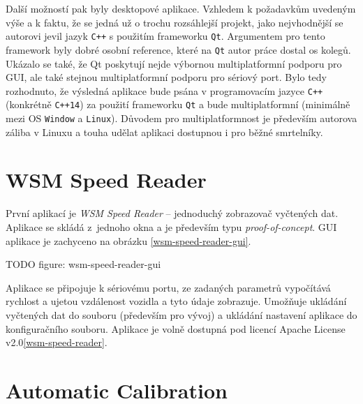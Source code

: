 Další možností pak byly desktopové aplikace. Vzhledem k požadavkům uvedeným
výše a k faktu, že se jedná už o trochu rozsáhlejší projekt, jako nejvhodnější
se autorovi jevil jazyk \texttt{C++} s použitím frameworku \texttt{Qt}.
Argumentem pro tento framework byly dobré osobní reference, které na
\texttt{Qt} autor práce dostal os kolegů. Ukázalo se také, že Qt poskytují
nejde výbornou multiplatformní podporu pro GUI, ale také stejnou
multiplatformní podporu pro sériový port. Bylo tedy rozhodnuto, že výsledná
aplikace bude psána v programovacím jazyce \texttt{C++} (konkrétně
\texttt{C++14}) za použití frameworku \texttt{Qt} a bude multiplatformní
(minimálně mezi OS \texttt{Window} a \texttt{Linux}). Důvodem pro
multiplatformnost je především autorova záliba v Linuxu a touha udělat aplikaci
dostupnou i pro běžné smrtelníky.

\section{WSM Speed Reader}
\label{sec:sw-wsm-speed-reader}

První aplikací je \textit{WSM Speed Reader} -- jednoduchý zobrazovač vyčtených
dat. Aplikace se skládá z~jednoho okna a je především typu
\textit{proof-of-concept}. GUI aplikace je zachyceno na obrázku
\ref{wsm-speed-reader-gui}.

TODO figure: wsm-speed-reader-gui

Aplikace se připojuje k sériovému portu, ze zadaných parametrů vypočítává
rychlost a ujetou vzdálenost vozidla a tyto údaje zobrazuje. Umožňuje ukládání
vyčtených dat do souboru (především pro vývoj) a ukládání nastavení aplikace
do konfiguračního souboru. Aplikace je volně dostupná pod licencí Apache
License v2.0\ref{wsm-speed-reader}.

\section{Automatic Calibration}
\label{sec:sw-wsm-auto-calib}
